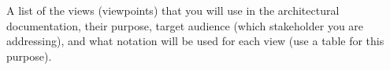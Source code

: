 A list of the views (viewpoints) that you will use in the architectural
documentation, their purpose, target audience (which stakeholder you are
addressing), and what notation will be used for each view (use a table for this purpose).
